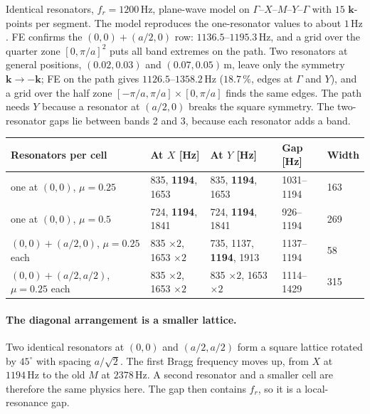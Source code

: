Identical resonators, $f_r = 1200\,\mathrm{Hz}$, plane-wave model on
$\Gamma$--$X$--$M$--$Y$--$\Gamma$ with $15$ $\mathbf{k}$-points per segment. The
model reproduces the one-resonator values to about $1\,\mathrm{Hz}$. FE confirms the
$(0,0) + (a/2,0)$ row: $1136.5$--$1195.3\,\mathrm{Hz}$, and a grid over the quarter
zone $[0,\pi/a]^2$ puts all band extremes on the path. Two resonators at general
positions, $(0.02, 0.03)$ and $(0.07, 0.05)\,\mathrm{m}$, leave only the symmetry
$\mathbf{k} \to -\mathbf{k}$; FE on the path gives $1126.5$--$1358.2\,\mathrm{Hz}$
($18.7\,\%$, edges at $\Gamma$ and $Y$), and a grid over the half zone
$[-\pi/a,\pi/a] \times [0,\pi/a]$ finds the same edges. The path needs $Y$ because a resonator at $(a/2, 0)$ breaks the square
symmetry. The two-resonator gaps lie between bands 2 and 3, because each resonator
adds a band.
\begin{center}
\begin{tabular}{|p{}|p{}|p{}|l|l|}
\hline
Resonators per cell & At $X$ [Hz] & At $Y$ [Hz] & Gap [Hz] & Width \\
\hline
one at $(0,0)$, $\mu = 0.25$ & 835, \textbf{1194}, 1653 & 835, \textbf{1194}, 1653 & 1031--1194 & 163 \\
one at $(0,0)$, $\mu = 0.5$ & 724, \textbf{1194}, 1841 & 724, \textbf{1194}, 1841 & 926--1194 & 269 \\
$(0,0) + (a/2, 0)$, $\mu = 0.25$ each & 835 $\times 2$, 1653 $\times 2$ & 735, 1137, \textbf{1194}, 1913 & 1137--1194 & 58 \\
$(0,0) + (a/2, a/2)$, $\mu = 0.25$ each & 835 $\times 2$, 1653 $\times 2$ & 835 $\times 2$, 1653 $\times 2$ & 1114--1429 & 315 \\
\hline
\end{tabular}
\end{center}

\paragraph{The diagonal arrangement is a smaller lattice.}
Two identical resonators at $(0,0)$ and $(a/2, a/2)$ form a square lattice rotated
by $45^\circ$ with spacing $a/\sqrt{2}$. The first Bragg frequency moves up, from
$X$ at $1194\,\mathrm{Hz}$ to the old $M$ at $2378\,\mathrm{Hz}$. A second resonator
and a smaller cell are therefore the same physics here. The gap then contains
$f_r$, so it is a local-resonance gap.


